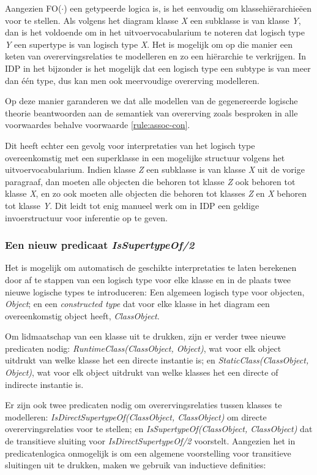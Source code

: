 Aangezien FO($\cdot$) een getypeerde logica is, is het eenvoudig om klassehi\"erarchie\"een voor te stellen. Als volgens het diagram klasse \textit{X} een subklasse is van klasse \textit{Y}, dan is het voldoende om in het uitvoervocabularium te noteren dat logisch type \textit{Y} een supertype is van logisch type \textit{X}. Het is mogelijk om op die manier een keten van overervingsrelaties te modelleren en zo een hi\"erarchie te verkrijgen. In IDP in het bijzonder is het mogelijk dat een logisch type een subtype is van meer dan \'e\'en type, dus kan men ook meervoudige overerving modelleren.

Op deze manier garanderen we dat alle modellen van de gegenereerde logische theorie beantwoorden aan de semantiek van overerving zoals besproken in alle voorwaardes behalve voorwaarde \ref{rule:assoc-con}.

Dit heeft echter een gevolg voor interpretaties van het logisch type overeenkomstig met een superklasse in een mogelijke structuur volgens het uitvoervocabularium. Indien klasse \textit{Z} een subklasse is van klasse \textit{X} uit de vorige paragraaf, dan moeten alle objecten die behoren tot klasse \textit{Z} ook behoren tot klasse \textit{X}, en zo ook moeten alle objecten die behoren tot klasses \textit{Z} en \textit{X} behoren tot klasse \textit{Y}. Dit leidt tot enig manueel werk om in IDP een geldige invoerstructuur voor inferentie op te geven.

\subsubsection{Een nieuw predicaat \textit{IsSupertypeOf/2}}

Het is mogelijk om automatisch de geschikte interpretaties te laten berekenen door af te stappen van een logisch type voor elke klasse en in de plaats twee nieuwe logische types te introduceren: Een algemeen logisch type voor objecten, \textit{Object}; en een \textit{constructed type}\cite{DeCatBroes2014PLaa} dat voor elke klasse in het diagram een overeenkomstig object heeft, \textit{ClassObject}.

Om lidmaatschap van een klasse uit te drukken, zijn er verder twee nieuwe predicaten nodig: \textit{RuntimeClass(ClassObject, Object)}, wat voor elk object uitdrukt van welke klasse het een directe instantie is; en \textit{StaticClass(ClassObject, Object)}, wat voor elk object uitdrukt van welke klasses het een directe of indirecte instantie is.

Er zijn ook twee predicaten nodig om overervingsrelaties tussen klasses te modelleren: \textit{IsDirectSupertypeOf(ClassObject, ClassObject)} om directe overervingsrelaties voor te stellen; en \textit{IsSupertypeOf(ClassObject, ClassObject)} dat de transitieve sluiting voor \textit{IsDirectSupertypeOf/2} voorstelt. Aangezien het in predicatenlogica onmogelijk is om een algemene voorstelling voor transitieve sluitingen uit te drukken, maken we gebruik van inductieve definities\cite{DeCatBroes2014PLaa}:

